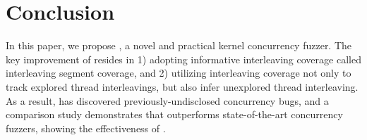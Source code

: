 \section{Conclusion}
\label{s:conclusion}




In this paper, we propose \sys, a novel and practical kernel
concurrency fuzzer.
%
The key improvement of \sys resides in 1) adopting informative
interleaving coverage called interleaving segment coverage, and 2)
utilizing interleaving coverage not only to track explored thread
interleavings, but also infer unexplored thread interleaving.
%
As a result, \sys has discovered \totalbugs previously-undisclosed
concurrency bugs, and a comparison study demonstrates that \sys
outperforms state-of-the-art concurrency fuzzers, showing the
effectiveness of \sys.



